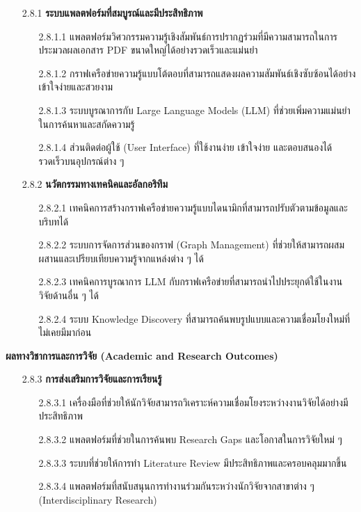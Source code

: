 \documentclass[12pt,a4paper]{article}
\begin{document}
\begin{enumerate}[leftmargin=2cm]
{        \begin{enumerate}
            \item[2.8.1] \textbf{ระบบแพลตฟอร์มที่สมบูรณ์และมีประสิทธิภาพ}
            \begin{enumerate}
                \item[2.8.1.1] แพลตฟอร์มวิศวกรรมความรู้เชิงสัมพันธ์การปรากฏร่วมที่มีความสามารถในการประมวลผลเอกสาร PDF ขนาดใหญ่ได้อย่างรวดเร็วและแม่นยำ
                \item[2.8.1.2] กราฟเครือข่ายความรู้แบบโต้ตอบที่สามารถแสดงผลความสัมพันธ์เชิงซับซ้อนได้อย่างเข้าใจง่ายและสวยงาม
                \item[2.8.1.3] ระบบบูรณาการกับ Large Language Models (LLM) ที่ช่วยเพิ่มความแม่นยำในการค้นหาและสกัดความรู้
                \item[2.8.1.4] ส่วนติดต่อผู้ใช้ (User Interface) ที่ใช้งานง่าย เข้าใจง่าย และตอบสนองได้รวดเร็วบนอุปกรณ์ต่าง ๆ
            \end{enumerate}

            \item[2.8.2] \textbf{นวัตกรรมทางเทคนิคและอัลกอริทึม}
            \begin{enumerate}
                \item[2.8.2.1] เทคนิคการสร้างกราฟเครือข่ายความรู้แบบไดนามิกที่สามารถปรับตัวตามข้อมูลและบริบทได้
                \item[2.8.2.2] ระบบการจัดการส่วนของกราฟ (Graph Management) ที่ช่วยให้สามารถผสมผสานและเปรียบเทียบความรู้จากแหล่งต่าง ๆ ได้
                \item[2.8.2.3] เทคนิคการบูรณาการ LLM กับกราฟเครือข่ายที่สามารถนำไปประยุกต์ใช้ในงานวิจัยด้านอื่น ๆ ได้
                \item[2.8.2.4] ระบบ Knowledge Discovery ที่สามารถค้นพบรูปแบบและความเชื่อมโยงใหม่ที่ไม่เคยมีมาก่อน
            \end{enumerate}
        \end{enumerate}

        \vspace{6cm}

        \textbf{ผลทางวิชาการและการวิจัย (Academic and Research Outcomes)}

        \begin{enumerate}
            \item[2.8.3] \textbf{การส่งเสริมการวิจัยและการเรียนรู้}
            \begin{enumerate}
                \item[2.8.3.1] เครื่องมือที่ช่วยให้นักวิจัยสามารถวิเคราะห์ความเชื่อมโยงระหว่างงานวิจัยได้อย่างมีประสิทธิภาพ
                \item[2.8.3.2] แพลตฟอร์มที่ช่วยในการค้นพบ Research Gaps และโอกาสในการวิจัยใหม่ ๆ
                \item[2.8.3.3] ระบบที่ช่วยให้การทำ Literature Review มีประสิทธิภาพและครอบคลุมมากขึ้น
                \item[2.8.3.4] แพลตฟอร์มที่สนับสนุนการทำงานร่วมกันระหว่างนักวิจัยจากสาขาต่าง ๆ (Interdisciplinary Research)
            \end{enumerate}


\end{enumerate}}
\end{enumerate}
\end{document}
